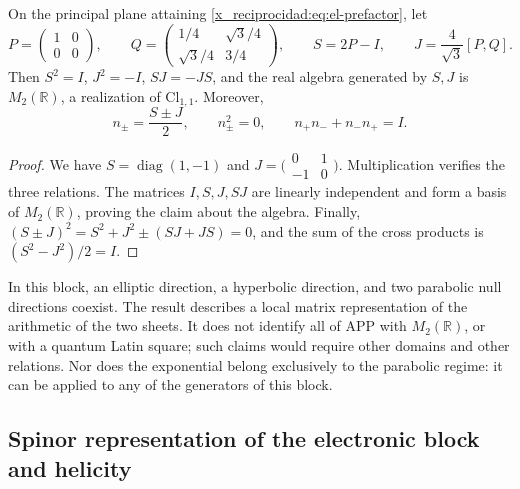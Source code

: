 \begin{proposition}
On the principal plane attaining \eqref{x_reciprocidad:eq:el-prefactor}, let
\[
 P=\begin{pmatrix}1&0\\0&0\end{pmatrix},\qquad
 Q=\begin{pmatrix}1/4&\sqrt3/4\\\sqrt3/4&3/4\end{pmatrix},\qquad
 S=2P-I,\qquad J=\frac4{\sqrt3}[P,Q].
\]
Then \(S^2=I\), \(J^2=-I\), \(SJ=-JS\), and the real algebra
generated by \(S,J\) is \(M_2(\mathbb R)\), a realization of
\(\mathrm{Cl}_{1,1}\). Moreover,
\[
 n_\pm=\frac{S\pm J}{2},\qquad
 n_\pm^2=0,\qquad n_+n_-+n_-n_+=I.
\]
\end{proposition}
\begin{proof}
We have \(S=\operatorname{diag}(1,-1)\) and
\(J=\bigl(\begin{smallmatrix}0&1\\-1&0\end{smallmatrix}\bigr)\).
Multiplication verifies the three relations. The matrices
\(I,S,J,SJ\) are linearly independent and form a basis of
\(M_2(\mathbb R)\), proving the claim about the algebra.
Finally, \((S\pm J)^2=S^2+J^2\pm(SJ+JS)=0\), and the sum of the
cross products is \((S^2-J^2)/2=I\).
\end{proof}

In this block, an elliptic direction, a hyperbolic direction, and two
parabolic null directions coexist. The result describes a local
matrix representation of the arithmetic of the two sheets. It does not identify all of APP
with \(M_2(\mathbb R)\), or with a quantum Latin square; such
claims would require other domains and other relations. Nor does the
exponential belong exclusively to the parabolic regime: it can
be applied to any of the generators of this block.


\subsection{Spinor representation of the electronic block and helicity}
\label{x_reciprocidad:sec:el-representacion-espinorial}

